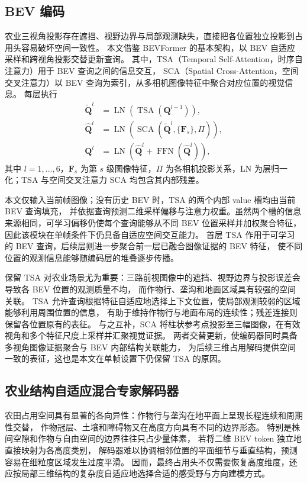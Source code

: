 \documentclass[a4paper,fleqn]{cas-sc}
\begin{document}
\subsection{BEV 编码}\label{sec:bev}
农业三视角投影存在遮挡、视野边界与局部观测缺失，直接把各位置独立投影到占用头容易破坏空间一致性。
本文借鉴 BEVFormer 的基本架构\citep{li2022bevformer}，以 BEV 自适应采样和跨视角投影交替更新查询。
其中，TSA（Temporal Self-Attention，时序自注意力）用于 BEV 查询之间的信息交互，
SCA（Spatial Cross-Attention，空间交叉注意力）以 BEV 查询为索引，从多相机图像特征中聚合对应位置的视觉信息。
每层执行
\begin{equation}
\begin{aligned}
\widetilde{\bm Q}^{l}&=\operatorname{LN}\!\left(\operatorname{TSA}(\bm Q^{l-1})\right),\\
\widehat{\bm Q}^{l}&=\operatorname{LN}\!\left(\operatorname{SCA}(\widetilde{\bm Q}^{l},\{\bm F_s\},\Pi)\right),\\
\bm Q^l&=\operatorname{LN}\!\left(\widehat{\bm Q}^{l}+\operatorname{FFN}(\widehat{\bm Q}^{l})\right),
\end{aligned}
\end{equation}
其中 $l=1,\ldots,6$，$\bm F_s$ 为第 $s$ 级图像特征，$\Pi$ 为各相机投影关系，LN 为层归一化；TSA 与空间交叉注意力 SCA 均包含其内部残差。

本文仅输入当前帧图像；没有历史 BEV 时，TSA 的两个内部 value 槽均由当前 BEV 查询填充，
并依据查询预测二维采样偏移与注意力权重。虽然两个槽的信息来源相同，可学习偏移仍使每个查询能够从不同 BEV 位置采样并加权聚合特征，
因此该模块在单帧条件下仍具备自适应空间交互能力。
首层 TSA 作用于可学习的 BEV 查询，后续层则进一步聚合前一层已融合图像证据的 BEV 特征，
使不同位置的观测信息能够随编码层的堆叠逐步传播。

保留 TSA 对农业场景尤为重要：三路前视图像中的遮挡、视野边界与投影误差会导致各 BEV 位置的观测质量不均，
而作物行、垄沟和地面区域具有较强的空间关联。
TSA 允许查询根据特征自适应地选择上下文位置，使局部观测较弱的区域能够利用周围位置的信息，
有助于维持作物行与地面布局的连续性；残差连接则保留各位置原有的表征。
与之互补，SCA 将柱状参考点投影至三幅图像，在有效视角和多个特征尺度上采样并汇聚视觉证据。
两者交替更新，使编码器同时具备多视角图像证据聚合与 BEV 内部结构关联能力，
为后续三维占用解码提供空间一致的表征，这也是本文在单帧设置下仍保留 TSA 的原因。

\subsection{农业结构自适应混合专家解码器}\label{sec:amoe}
农田占用空间具有显著的各向异性：作物行与垄沟在地平面上呈现长程连续和周期性交替，
作物冠层、土壤和障碍物又在高度方向具有不同的边界形态。
特别是株间空隙和作物与自由空间的边界往往只占少量体素，
若将二维 BEV token 独立地直接映射为各高度类别，
解码器难以协调相邻位置的平面细节与垂直结构，预测容易在细粒度区域发生过度平滑。
因而，最终占用头不仅需要恢复高度维度，还应按局部三维结构的复杂度自适应地选择合适的感受野与方向建模方式。
\end{document}
